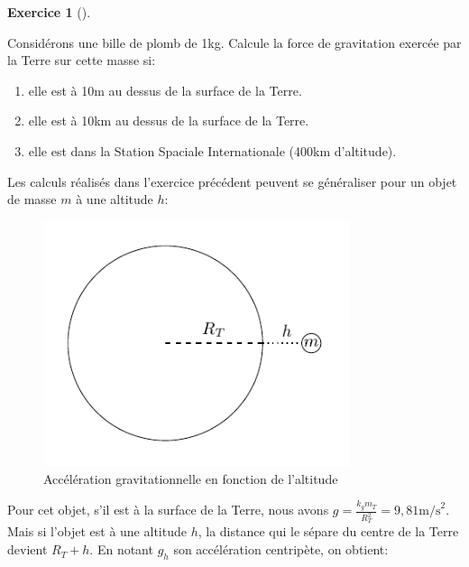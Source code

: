 \documentclass[
  letterpaper,
  DIV=11,
  numbers=noendperiod]{scrartcl}
\providecommand{\tightlist}{%
  \setlength{\itemsep}{0pt}\setlength{\parskip}{0pt}}\usepackage{longtable,booktabs,array}
\theoremstyle{definition}
\newtheorem{exercise}{Exercice}[section]
\theoremstyle{definition}
\theoremstyle{definition}
\theoremstyle{remark}
\begin{document}
\begin{exercise}[]\protect\hypertarget{exr-alt}{}\label{exr-alt}

Considérons une bille de plomb de 1kg. Calcule la force de gravitation
exercée par la Terre sur cette masse si:

\begin{enumerate}
\def\labelenumi{\arabic{enumi}.}
\tightlist
\item
  elle est à 10m au dessus de la surface de la Terre.
\item
  elle est à 10km au dessus de la surface de la Terre.
\item
  elle est dans la Station Spaciale Internationale (400km d'altitude).
\end{enumerate}

\end{exercise}

Les calculs réalisés dans l'exercice précédent peuvent se généraliser
pour un objet de masse \(m\) à une altitude \(h\):

\begin{figure}[H]

{\centering \includegraphics[width=0.8\textwidth,height=\textheight]{figures/grav/fig5.pdf}

}

\caption{Accélération gravitationnelle en fonction de l'altitude}

\end{figure}%

Pour cet objet, s'il est à la surface de la Terre, nous avons
\(g = \frac{k_g m_T}{R_T^2}=9,81 \text{m/s}^2\). Mais si l'objet est à
une altitude \(h\), la distance qui le sépare du centre de la Terre
devient \(R_T + h\). En notant \(g_h\) son accélération centripète, on
obtient:
\end{document}

